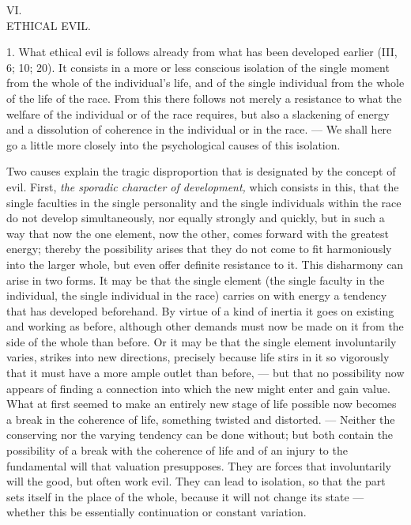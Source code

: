\documentclass[12pt,a4paper,openany]{book}
\newcommand{\opage}[1]{\marginnote{\footnotesize\textit{[#1]}}}
\newcounter{etikch}
\newcommand{\chapterhead}[2]{\stepcounter{etikch}\bigskip\begin{center}\pdfbookmark[1]{#1 #2}{etikch.\arabic{etikch}}#1\\[3pt]{\large #2}\end{center}\medskip}
\begin{document}
\chapterhead{VI.}{ETHICAL EVIL.}

1. What ethical evil is follows already from what has been developed earlier (III, 6; 10; 20). It
consists in a more or less conscious isolation of the single moment from the whole of the individual's
life, and of the single individual from the whole of the life of the race. From this there follows not
merely a resistance to what the welfare of the individual or of the race requires, but also a slackening
of energy and a dissolution of coherence in the individual or in the race. --- We shall here go a little
more closely into the psychological causes of this isolation.

Two causes explain the tragic disproportion that is designated by the concept of evil. First,
\textit{the sporadic character of development,} which consists in this, that the single faculties in the
single personality and the single individuals within the race do not develop simultaneously, nor equally
strongly and quickly, but in such a way that now the one element, now the other, comes forward with the
\opage{126}greatest energy; thereby the possibility arises that they do not come to fit harmoniously into the
larger whole, but even offer definite resistance to it. This disharmony can arise in two forms. It may be
that the single element (the single faculty in the individual, the single individual in the race) carries
on with energy a tendency that has developed beforehand. By virtue of a kind of inertia it goes on
existing and working as before, although other demands must now be made on it from the side of the whole
than before. Or it may be that the single element involuntarily varies, strikes into new directions,
precisely because life stirs in it so vigorously that it must have a more ample outlet than before, ---
but that no possibility now appears of finding a connection into which the new might enter and gain
value. What at first seemed to make an entirely new stage of life possible now becomes a break in the
coherence of life, something twisted and distorted. --- Neither the conserving nor the varying tendency
can be done without; but both contain the possibility of a break with the coherence of life and of an
injury to the fundamental will that valuation presupposes. They are forces that involuntarily will the
good, but often work evil. They can lead to isolation, so that the part sets itself in the place of the
whole, because it will not change its state --- whether this be essentially continuation or constant
variation.
\end{document}
